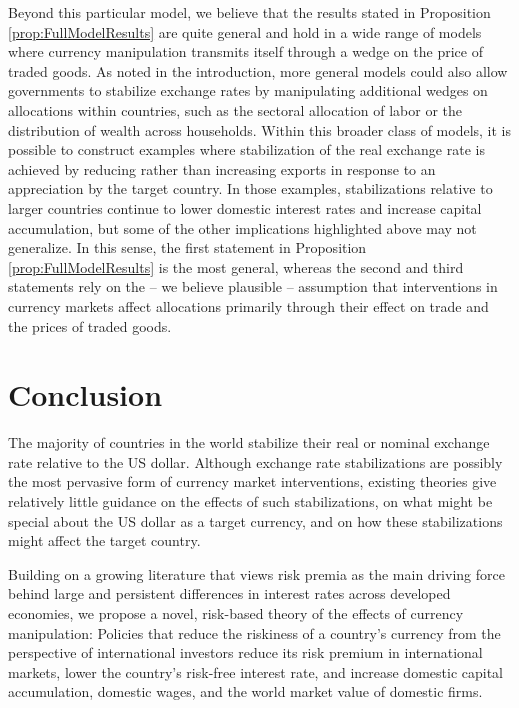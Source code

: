 \documentclass[12pt,letter]{article}
\theoremstyle{break} \theorembodyfont{\normalfont\itshape}
\theoremstyle{break}
\theoremstyle{break} \theorembodyfont{\normalfont\itshape}
\theoremstyle{break} \theorembodyfont{\normalfont\itshape}
\begin{document}
Beyond this particular model, we believe that the results stated in
Proposition \ref{prop:FullModelResults} are quite general and hold in
a wide range of models where currency manipulation transmits itself
through a wedge on the price of traded goods. As noted in the
introduction, more general models could also allow governments to
stabilize exchange rates by manipulating additional wedges on
allocations within countries, such as the sectoral allocation of labor
or the distribution of wealth across households. Within this broader
class of models, it is possible to construct examples where
stabilization of the real exchange rate is achieved by reducing rather
than increasing exports in response to an appreciation by the target
country. In those examples, stabilizations relative to larger
countries continue to lower domestic interest rates and increase
capital accumulation, but some of the other implications highlighted
above may not generalize. In this sense, the first statement in
Proposition \ref{prop:FullModelResults} is the most general, whereas
the second and third statements rely on the -- we believe plausible --
assumption that interventions in currency markets affect allocations
primarily through their effect on trade and the prices of traded
goods.



\section*{Conclusion\label{sec:conclusion}}

The majority of countries in the world stabilize their real or nominal
exchange rate relative to the US dollar. Although exchange rate
stabilizations are possibly the most pervasive form of currency market
interventions, existing theories give relatively little guidance on
the effects of such stabilizations, on what might be special about the
US dollar as a target currency, and on how these stabilizations might
affect the target country.

Building on a growing literature that views risk premia as the main
driving force behind large and persistent differences in interest
rates across developed economies, we propose a novel, risk-based
theory of the effects of currency manipulation: Policies that reduce
the riskiness of a country's currency from the perspective of
international investors reduce its risk premium in international
markets, lower the country's risk-free interest rate, and increase
domestic capital accumulation, domestic wages, and the world market
value of domestic firms.
\end{document}
